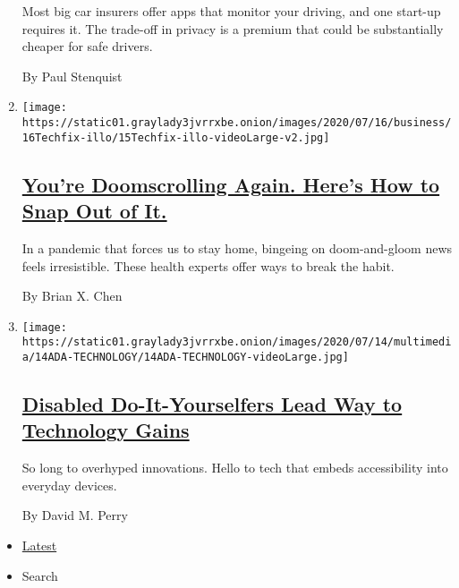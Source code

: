 \begin{enumerate}
  Most big car insurers offer apps that monitor your driving, and one
  start-up requires it. The trade-off in privacy is a premium that could
  be substantially cheaper for safe drivers.

  By Paul Stenquist
\item
  \texttt{[image: https://static01.graylady3jvrrxbe.onion/images/2020/07/16/business/16Techfix-illo/15Techfix-illo-videoLarge-v2.jpg]}

  \hypertarget{youre-doomscrolling-again-heres-how-to-snap-out-of-it}{%
  \subsection{\texorpdfstring{\href{/2020/07/15/technology/personaltech/youre-doomscrolling-again-heres-how-to-snap-out-of-it.html}{You're
  Doomscrolling Again. Here's How to Snap Out of
  It.}}{You're Doomscrolling Again. Here's How to Snap Out of It.}}\label{youre-doomscrolling-again-heres-how-to-snap-out-of-it}}

  In a pandemic that forces us to stay home, bingeing on doom-and-gloom
  news feels irresistible. These health experts offer ways to break the
  habit.

  By Brian X. Chen
\item
  \texttt{[image: https://static01.graylady3jvrrxbe.onion/images/2020/07/14/multimedia/14ADA-TECHNOLOGY/14ADA-TECHNOLOGY-videoLarge.jpg]}

  \hypertarget{disabled-do-it-yourselfers-lead-way-to-technology-gains}{%
  \subsection{\texorpdfstring{\href{/2020/07/14/style/assistive-technology.html}{Disabled
  Do-It-Yourselfers Lead Way to Technology
  Gains}}{Disabled Do-It-Yourselfers Lead Way to Technology Gains}}\label{disabled-do-it-yourselfers-lead-way-to-technology-gains}}

  So long to overhyped innovations. Hello to tech that embeds
  accessibility into everyday devices.

  By David M. Perry
\end{enumerate}

\begin{itemize}
\tightlist
\item
  \protect\hyperlink{stream-panel}{Latest}
\item
  Search
\end{itemize}

